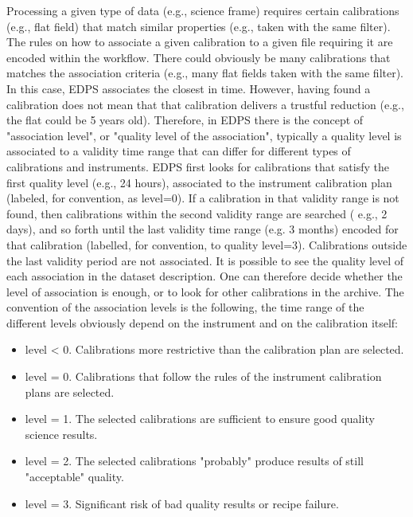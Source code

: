 \documentclass{article}
\begin{document}
            Processing a given type of data (e.g., science frame) requires certain calibrations (e.g., flat field) that match
similar properties (e.g., taken with the same filter). The rules on how to associate a given calibration to a given file
requiring it are encoded
within the workflow. There could obviously be many calibrations that matches the association criteria (e.g., many flat
fields taken with the same filter). In this case,  
EDPS associates the closest in time. However, having found a calibration does not mean that that calibration delivers a
trustful reduction (e.g., the flat could be 5 years old).
Therefore, in EDPS there is the concept of "association level", or "quality level of the association", typically a
quality level is associated to a validity time range that
can differ for different types of calibrations and instruments. EDPS first looks for calibrations that satisfy the first
quality level (e.g., 24 hours), associated to the instrument calibration plan (labeled, for convention, as level=0).
If a calibration in that validity range is not found, then calibrations within the second validity range are searched (
e.g., 2 days), and so forth until the last validity time range (e.g. 3 months)
encoded for that calibration (labelled, for convention, to quality level=3). Calibrations outside the last validity
period are not associated.
It is possible to see the quality level of each association in the dataset description. One can therefore decide whether
the level of association is enough, or to look for other calibrations in the archive.
The convention of the association levels is the following, the time range of the different levels obviously depend on
the instrument and on the calibration itself:

\begin{itemize}
\item level < 0. Calibrations more restrictive than the calibration plan are selected.
\end{itemize}
\begin{itemize}
\item level = 0. Calibrations that follow the rules of the instrument calibration plans are selected.
\end{itemize}
\begin{itemize}
\item level = 1. The selected calibrations are sufficient to ensure good quality science results.
\end{itemize}
\begin{itemize}
\item level = 2. The selected calibrations "probably" produce results of still "acceptable" quality.
\end{itemize}
\begin{itemize}
\item level = 3. Significant risk of bad quality results or recipe failure.
\end{itemize}

            
\end{document}
